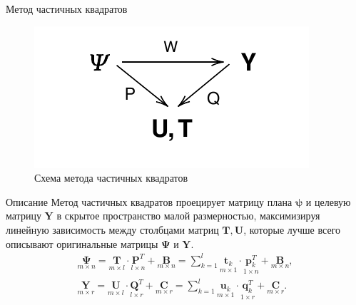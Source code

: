 \documentclass[9pt,pdf,hyperref={unicode}]{beamer}
\begin{document}
\begin{frame}{Метод частичных квадратов}
\begin{figure}
	\includegraphics[width=0.3\linewidth]{figs/pls.pdf}
	\caption{Схема метода частичных квадратов}
\end{figure}
\begin{block}{Описание}
	Метод частичных квадратов проецирует матрицу плана $\mathbf{\psi}$ и целевую матрицу $\mathbf{Y}$ в скрытое пространство малой размерностью, максимизируя линейную зависимость между столбцами матриц $\mathbf{T}, \mathbf{U}$, которые лучше всего описывают оригинальные матрицы $\mathbf{\Psi}$ и $\mathbf{Y}$.
	\begin{equation*}
	\begin{split}
	\underset{m\times n
	}{\mathbf{\Psi}}= \underset{m\times l}{\mathbf{T}} \cdot \underset{l\times n
	}{\mathbf{P}^T}
	+ \underset{m\times n}{\mathbf{B}}
	=
	\sum_{k=1}^{l}
	\underset{m\times 1}{\mathbf{t}_k}
	\cdot\underset{1\times n}{\mathbf{p}^T_k}
	+ \underset{m\times n}{\mathbf{B}}
	, 
	\\ 
	\underset{m\times r}{\mathbf{Y}}
	= \underset{m\times l}{\mathbf{U}} \cdot \underset{l\times r
	}{\mathbf{Q}^T}
	+ \underset{m\times r
	}{\mathbf{C}}= \sum_{k=1}^l
	\underset{m\times 1}{\mathbf{u}_k} \cdot \underset{1\times r}{\mathbf{q}^T_k}
	+ \underset{m\times r}{\mathbf{C}}.
	\end{split}
	\end{equation*}
\end{block}
\end{frame}
\end{document}
